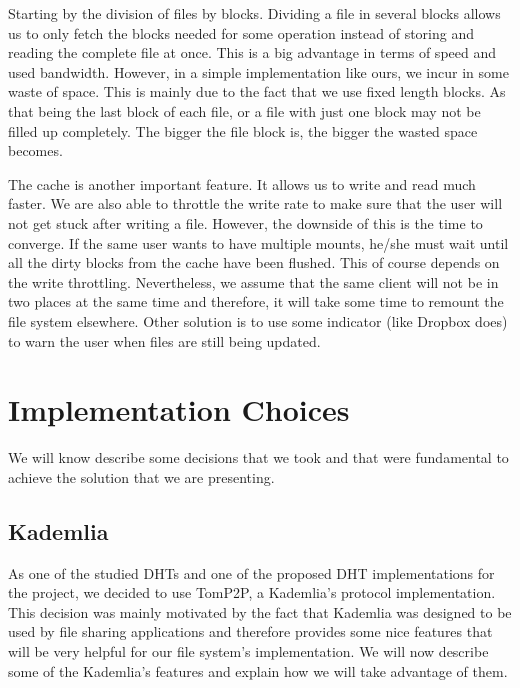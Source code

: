 \documentclass[times,9pt,article]{llncs}
\begin{document}
Starting by the division of files by blocks. Dividing a file in several blocks allows us to only fetch the blocks needed for some operation instead of storing and reading the complete file at once. This is a big advantage in terms of speed and used bandwidth. However, in a simple implementation like ours, we incur in some waste of space. This is mainly due to the fact that we use fixed length blocks. As that being the last block of each file, or a file with just one block may not be filled up completely. The bigger the file block is, the bigger the wasted space becomes.

The cache is another important feature. It allows us to write and read much faster. We are also able to throttle the write rate to make sure that the user will not get stuck after writing a file. However, the downside of this is the time to converge. If the same user wants to have multiple mounts, he/she must wait until all the dirty blocks from the cache have been flushed. This of course depends on the write throttling. Nevertheless, we assume that the same client will not be in two places at the same time and therefore, it will take some time to remount the file system elsewhere. Other solution is to use some indicator (like Dropbox does) to warn the user when files are still being updated. 

\section{Implementation Choices}

We will know describe some decisions that we took and that were fundamental to achieve the solution that we are presenting.

\subsection{Kademlia}
As one of the studied DHTs and one of the proposed DHT implementations for the project, we decided to use TomP2P, a Kademlia's protocol implementation.\\
This decision was mainly motivated by the fact that Kademlia was designed to be used by file sharing applications and therefore provides some nice features that will be very helpful for our file system's implementation. We will now describe  some of the Kademlia's features and explain how we will take advantage of them.
\end{document}
